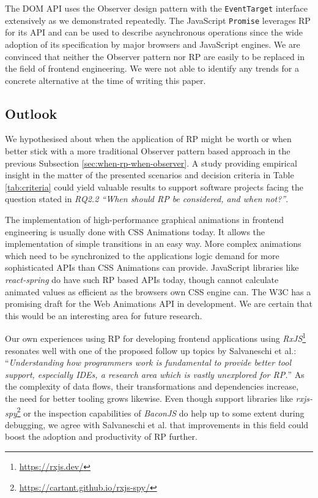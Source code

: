 \documentclass[12pt,a4paper]{article}
\begin{document}
The DOM API uses the Observer design pattern with the \texttt{EventTarget} interface extensively as we demonstrated repeatedly. The JavaScript \texttt{Promise} leverages RP for its API and can be used to describe asynchronous operations since the wide adoption of its specification by major browsers and JavaScript engines. We are convinced that neither the Observer pattern nor RP are easily to be replaced in the field of frontend engineering. We were not able to identify any trends for a concrete alternative at the time of writing this paper.

\subsection{Outlook}

We hypothesised about when the application of RP might be worth or when better stick with a more traditional Observer pattern based approach in the previous Subsection \ref{sec:when-rp-when-observer}. A study providing empirical insight in the matter of the presented scenarios and decision criteria in Table \ref{tab:criteria} could yield valuable results to support software projects facing the question stated in \emph{RQ2.2 ``When should RP be considered, and when not?''}.

The implementation of high-performance graphical animations in frontend engineering is usually done with CSS Animations today. It allows the implementation of simple transitions in an easy way. More complex animations which need to be synchronized to the applications logic demand for more sophisticated APIs than CSS Animations can provide. JavaScript libraries like \emph{react-spring} do have such RP based APIs today, though cannot calculate animated values as efficient as the browsers own CSS engine can. The W3C has a promising draft for the Web Animations API in development. We are certain that this would be an interesting area for future research.

Our own experiences using RP for developing frontend applications using \emph{RxJS}\footnote{\url{https://rxjs.dev/}} resonates well with one of the proposed follow up topics by Salvaneschi et al.: ``\emph{Understanding how programmers work is fundamental to provide better tool support, especially IDEs, a research area which is vastly unexplored for RP.}'' \cite{7827078} As the complexity of data flows, their transformations and dependencies increase, the need for better tooling grows likewise. Even though support libraries like \emph{rxjs-spy}\footnote{\url{https://cartant.github.io/rxjs-spy/}} or the inspection capabilities of \emph{BaconJS} do help up to some extent during debugging, we agree with Salvaneschi et al. that improvements in this field could boost the adoption and productivity of RP further.
\end{document}
